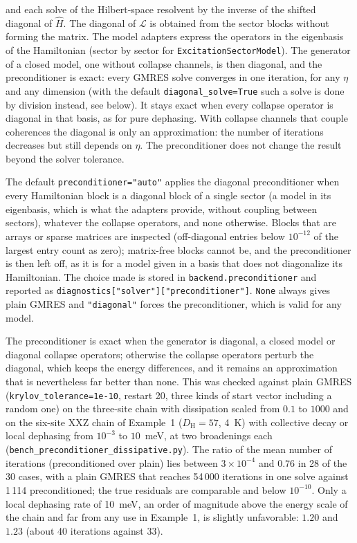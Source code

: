 \documentclass[11pt]{article}
\begin{document}
and each solve of the Hilbert-space resolvent by the inverse of the shifted
diagonal of \(\hat{H}\). The diagonal of \(\mathcal{L}\) is obtained from the
sector blocks without forming the matrix. The model adapters express the
operators in the eigenbasis of the Hamiltonian (sector by sector for
\texttt{ExcitationSectorModel}). The generator of a closed model, one without
collapse channels, is then diagonal, and the preconditioner is exact: every
GMRES solve converges in one iteration, for any \(\eta\) and any dimension
(with the default \texttt{diagonal\_solve=True} such a solve is done by division instead, see below).
It stays exact when every collapse operator is diagonal in that basis, as for pure dephasing.
With collapse channels that couple coherences the diagonal is only an
approximation: the number of iterations decreases but still depends on
\(\eta\). The preconditioner does not change the result beyond the solver
tolerance.

The default \texttt{preconditioner="auto"} applies the diagonal preconditioner when every Hamiltonian block is a diagonal block of a single sector (a model in its eigenbasis, which is what the adapters provide, without coupling between sectors), whatever the collapse operators, and none otherwise. Blocks that are arrays or sparse matrices are inspected (off-diagonal entries below $10^{-12}$ of the largest entry count as zero); matrix-free blocks cannot be, and the preconditioner is then left off, as it is for a model given in a basis that does not diagonalize its Hamiltonian. The choice made is stored in \texttt{backend.preconditioner} and reported as \texttt{diagnostics["solver"]["preconditioner"]}. \texttt{None} always gives plain GMRES and \texttt{"diagonal"} forces the preconditioner, which is valid for any model.

The preconditioner is exact when the generator is diagonal, a closed model or diagonal collapse operators; otherwise the collapse operators perturb the diagonal, which keeps the energy differences, and it remains an approximation that is nevertheless far better than none. This was checked against plain GMRES (\texttt{krylov\_tolerance=1e-10}, restart 20, three kinds of start vector including a random one) on the three-site chain with dissipation scaled from $0.1$ to $1000$ and on the six-site XXZ chain of Example~1 ($D_{\mathrm H}=57$, 4~K) with collective decay or local dephasing from $10^{-3}$ to $10$~meV, at two broadenings each (\texttt{bench\_preconditioner\_dissipative.py}). The ratio of the mean number of iterations (preconditioned over plain) lies between $3\times10^{-4}$ and $0.76$ in 28 of the 30 cases, with a plain GMRES that reaches 54\,000 iterations in one solve against 1\,114 preconditioned; the true residuals are comparable and below $10^{-10}$. Only a local dephasing rate of 10~meV, an order of magnitude above the energy scale of the chain and far from any use in Example~1, is slightly unfavorable: $1.20$ and $1.23$ (about 40 iterations against 33).
\end{document}
